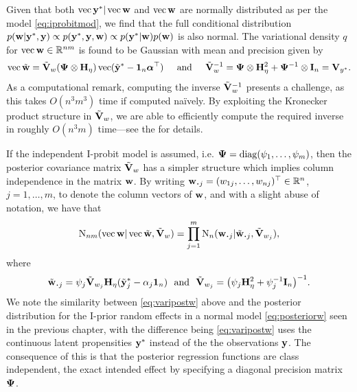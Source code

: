 Given that both $\operatorname{vec} {\mathbf y}^* | \operatorname{vec} {\mathbf w}$ and $\operatorname{vec}{\mathbf w}$ are normally distributed as per the model \cref{eq:iprobitmod}, we find that the full conditional distribution $p({\mathbf w}|{\mathbf y}^*,{\mathbf y}) \propto p({\mathbf y}^*,{\mathbf y},{\mathbf w}) \propto p({\mathbf y}^*|{\mathbf w})p({\mathbf w})$ is also normal. 
The variational density $q$ for $\operatorname{vec} {\mathbf w} \in \mathbb{R}^{nm}$ is found to be Gaussian with mean and precision given by
\begin{gather}\label{eq:varipostw}
   \operatorname{vec} \tilde{{\mathbf w}} = \tilde{{\mathbf V}}_w 
    ({\bm\Psi} \otimes {\mathbf H}_\eta) \operatorname{vec} (\tilde{{\mathbf y}}^* - {\mathbf 1}_n{\bm\alpha}^\top)
  \hspace{0.5cm}\text{and}\hspace{0.5cm} 
  \tilde {{\mathbf V}}_w^{-1} = {\bm\Psi} \otimes {\mathbf H}_\eta^2 + {\bm\Psi}^{-1} \otimes {\mathbf I}_n = {\mathbf V}_{y^*}.
\end{gather}
As a computational remark, computing the inverse $\tilde{{\mathbf V}}_w^{-1}$ presents a challenge, as this takes $O(n^3m^3)$ time if computed naïvely. 
By exploiting the Kronecker product structure in $\tilde{{\mathbf V}}_w$, we are able to efficiently compute the required inverse in roughly $O(n^3m)$ time---see the  for details.

If the independent I-probit model is assumed, i.e. ${\bm\Psi} = \operatorname{diag}(\psi_1,\dots,\psi_m)$, then the posterior covariance matrix $\tilde{{\mathbf V}}_w$ has a simpler structure which implies column independence in the matrix ${\mathbf w}$.
By writing $\bw_{\bigcdot j} = (w_{1j},\dots,w_{nj})^\top \in \bbR^n$, $j=1,\dots,m$, to denote the column vectors of ${\mathbf w}$, and with a slight abuse of notation, we have that
\begin{align*}
  \N_{nm}(\vecc \bw|\vecc\wtilde, \tilde\bV_w) 
  = \prod_{j=1}^m \N_{n}(\bw_{\bigcdot j}|\tilde\bw_{\bigcdot j}, \tilde\bV_{w_j}),
\end{align*}
where 
\[
  \tilde \bw_{\bigcdot j} = \psi_j\tilde \bV_{w_j}\bH_\eta (\tilde\by^*_j - \alpha_j\bone_n) \ \text{ and } \ \tilde \bV_{w_j} = \big(\psi_j\bH_{\eta}^2 + \psi_j^{-1}\bI_n \big)^{-1}.
\]
We note the similarity between \cref{eq:varipostw} above and the posterior distribution for the I-prior random effects in a normal model \cref{eq:posteriorw} seen in the previous chapter, with the difference being \cref{eq:varipostw} uses the continuous latent propensities ${\mathbf y}^*$ instead of the the observations ${\mathbf y}$.
The consequence of this is that the posterior regression functions are class independent, the exact intended effect by specifying a diagonal precision matrix ${\bm\Psi}$.

